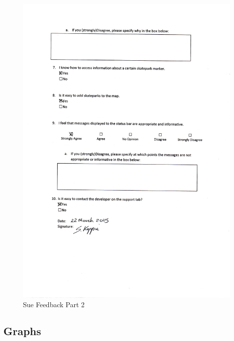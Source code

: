 \begin{itemize}
\begin{figure}[H]
    \includegraphics[width=\textwidth]{./Evaluation/images/SueFeedback2.pdf}
    \caption{Sue Feedback Part 2} \label{fig:SueFeedback2}
\end{figure}



\subsection{Graphs}


\end{itemize}
